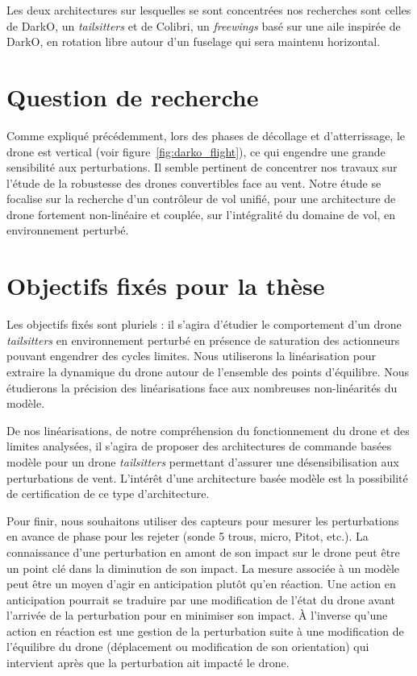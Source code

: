 Les deux architectures sur lesquelles se sont concentrées nos recherches sont celles de DarkO, un \textit{tailsitters} et de Colibri, un \textit{freewings} basé sur une aile inspirée de DarkO, en rotation libre autour d'un fuselage qui sera maintenu horizontal.


\section*{Question de recherche}

Comme expliqué précédemment, lors des phases de décollage et d'atterrissage, le drone est vertical (voir figure~\ref{fig:darko_flight}), ce qui engendre une grande sensibilité aux perturbations. Il semble pertinent de concentrer nos travaux sur l'étude de la robustesse des drones convertibles face au vent.
Notre étude se focalise sur la recherche d'un contrôleur de vol unifié, pour une architecture de drone fortement non-linéaire et couplée, sur l'intégralité du domaine de vol, en environnement perturbé.

\section*{Objectifs fixés pour la thèse}
Les objectifs fixés sont pluriels : il s'agira d'étudier le comportement d'un drone \textit{tailsitters} en environnement perturbé en présence de saturation des actionneurs pouvant engendrer des cycles limites. Nous utiliserons la linéarisation pour extraire la dynamique du drone autour de l'ensemble des points d'équilibre. Nous étudierons la précision des linéarisations face aux nombreuses non-linéarités du modèle. 

De nos linéarisations, de notre compréhension du fonctionnement du drone et des limites analysées, il s'agira de proposer des architectures de commande basées modèle pour un drone \textit{tailsitters} permettant d'assurer une désensibilisation aux perturbations de vent. L'intérêt d'une architecture basée modèle est la possibilité de certification de ce type d'architecture. 

Pour finir, nous souhaitons utiliser des capteurs pour mesurer les perturbations en avance de phase pour les rejeter (sonde 5 trous, micro, Pitot, etc.). La connaissance d'une perturbation en amont de son impact sur le drone peut être un point clé dans la diminution de son impact. La mesure associée à un modèle peut être un moyen d'agir en anticipation plutôt qu'en réaction. Une action en anticipation pourrait se traduire par une modification de l'état du drone avant l'arrivée de la perturbation pour en minimiser son impact. À l'inverse qu'une action en réaction est une gestion de la perturbation suite à une modification de l'équilibre du drone (déplacement ou modification de son orientation) qui intervient après que la perturbation ait impacté le drone.  

